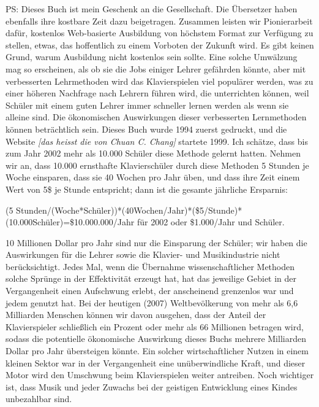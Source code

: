 PS: Dieses Buch ist mein Geschenk an die Gesellschaft.
 Die Übersetzer haben ebenfalls ihre kostbare Zeit dazu beigetragen.
 Zusammen leisten wir Pionierarbeit dafür, kostenlos Web-basierte Ausbildung von höchstem Format zur Verfügung zu stellen, etwas, das hoffentlich zu einem Vorboten der Zukunft wird.
 Es gibt keinen Grund, warum Ausbildung nicht kostenlos sein sollte.
 Eine solche Umwälzung mag so erscheinen, als ob sie die Jobs einiger Lehrer gefährden könnte, aber mit verbesserten Lehrmethoden wird das Klavierspielen viel populärer werden, was zu einer höheren Nachfrage nach Lehrern führen wird, die unterrichten können, weil Schüler mit einem guten Lehrer immer schneller lernen werden als wenn sie alleine sind.
 Die ökonomischen Auswirkungen dieser verbesserten Lernmethoden können beträchtlich sein.
 Dieses Buch wurde 1994 zuerst gedruckt, und die Website \textit{[das heisst die von Chuan C. Chang]} startete 1999.
 Ich schätze, dass bis zum Jahr 2002 mehr als 10.000 Schüler diese Methode gelernt hatten.
 Nehmen wir an, dass 10.000 ernsthafte Klavierschüler durch diese Methoden 5 Stunden je Woche einsparen, dass sie 40 Wochen pro Jahr üben, und dass ihre Zeit einem Wert von 5\$ je Stunde entspricht; dann ist die gesamte jährliche Ersparnis:
 

(5 Stunden/(Woche*Schüler))*(40Wochen/Jahr)*(\$5/Stunde)*(10.000Schüler)=\$10.000.000/Jahr für 2002 oder \$1.000/Jahr und Schüler.
 

10 Millionen Dollar pro Jahr sind nur die Einsparung der Schüler; wir haben die Auswirkungen für die Lehrer sowie die Klavier- und Musikindustrie nicht berücksichtigt.
 Jedes Mal, wenn die Übernahme wissenschaftlicher Methoden solche Sprünge in der Effektivität erzeugt hat, hat das jeweilige Gebiet in der Vergangenheit einen Aufschwung erlebt, der anscheinend grenzenlos war und jedem genutzt hat.
 Bei der heutigen (2007) Weltbevölkerung von mehr als 6,6 Milliarden Menschen können wir davon ausgehen, dass der Anteil der Klavierspieler schließlich ein Prozent oder mehr als 66 Millionen betragen wird, sodass die potentielle ökonomische Auswirkung dieses Buchs mehrere Milliarden Dollar pro Jahr übersteigen könnte.
 Ein solcher wirtschaftlicher Nutzen in einem kleinen Sektor war in der Vergangenheit eine unüberwindliche Kraft, und dieser Motor wird den Umschwung beim Klavierspielen weiter antreiben.
 Noch wichtiger ist, dass Musik und jeder Zuwachs bei der geistigen Entwicklung eines Kindes unbezahlbar sind.
 